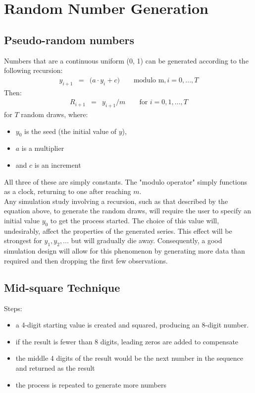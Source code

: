 \section{Random Number Generation}

\subsection{Pseudo-random numbers}
Numbers that are a continuous uniform (0, 1) can be generated according to the following recursion:
\begin{eqnarray}
	y_{i + 1} &=& \big(a\cdot y_{i} + c\big)\qquad\text{modulo m}, i = 0, ..., T
\end{eqnarray}
Then:
\begin{eqnarray}
	R_{i + 1} &=& y_{i + 1} / m\qquad\text{for }i = 0, 1, ..., T
\end{eqnarray}
for $T$ random draws, where:
\begin{itemize}
	\item  $y_{0}$ is the seed (the initial value of $y$),
	\item $a$ is a multiplier
	\item and $c$ is an increment
\end{itemize}
All three of these are simply constants. The "modulo operator" simply functions as a clock, returning to one after reaching $m$.\\
Any simulation study involving a recursion, such as that described by the equation above, to generate the random draws, will require the user to specify an initial value $y_{0}$ to get the process started. The choice of this value will, undesirably, affect the properties of the generated series. This effect will be strongest for $y_{1}, y_{2}, ...$ but will gradually die away. Consequently, a good simulation design will allow for this phenomenon by generating more data than required and then dropping the first few observations.

\subsection{Mid-square Technique}
Steps:
\begin{itemize}
	\item a 4-digit starting value is created and squared, producing an $8$-digit number.
	\item if the result is fewer than 8 digits, leading zeros are added to compensate
	\item the middle 4 digits of the result would be the next number in the sequence and returned as the result
	\item the process is repeated to generate more numbers
\end{itemize}

